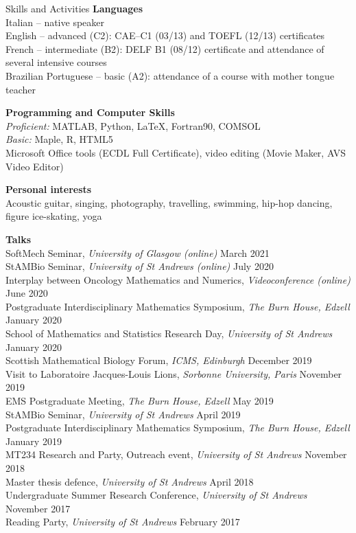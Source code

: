 \documentclass{resume} %
\begin{document}
\begin{rSection}{Skills and Activities}
{\bf Languages} \\
{Italian -- native speaker \\
English -- advanced (C2): CAE–C1 (03/13) and TOEFL (12/13) certificates \\
French – intermediate (B2): DELF B1 (08/12) certificate and attendance of several intensive courses %
\\ Brazilian Portuguese – basic (A2): attendance of a course with mother tongue teacher}

{\bf Programming and Computer Skills} \\
{{\em Proficient:} MATLAB, Python, LaTeX, Fortran90, COMSOL \\ {\em Basic:} Maple, R, HTML5 \\  Microsoft Office tools (ECDL Full Certificate), video editing (Movie Maker, AVS Video Editor)}

{\bf Personal interests}  \\
{Acoustic guitar, singing, photography, travelling, swimming, hip-hop dancing, figure ice-skating, yoga} 

{\bf Talks}  \\
SoftMech Seminar,  {\em University of Glasgow (online)} \hfill {March 2021} \\
StAMBio Seminar,  {\em University of St Andrews (online)} \hfill {July 2020} \\
Interplay between Oncology Mathematics and Numerics,  {\em Videoconference (online)} \hfill {June 2020} \\
Postgraduate Interdisciplinary Mathematics Symposium, {\em The Burn House, Edzell} \hfill {January 2020}\\
School of Mathematics and Statistics Research Day, {\em University of St Andrews} \hfill {January 2020}\\
Scottish Mathematical Biology Forum, {\em ICMS, Edinburgh}  \hfill {December 2019}\\
Visit to Laboratoire Jacques-Louis Lions,  {\em Sorbonne University, Paris} \hfill {November 2019} \\
EMS Postgraduate Meeting,  {\em The Burn House, Edzell} \hfill {May 2019} \\
StAMBio Seminar,  {\em University of St Andrews} \hfill {April 2019} \\
Postgraduate Interdisciplinary Mathematics Symposium,  {\em The Burn House, Edzell} \hfill {January 2019} \\
{MT234 Research and Party, Outreach event, {\em University of St Andrews} \hfill {November 2018} \\
Master thesis defence,  {\em University of St Andrews} \hfill {April 2018} \\
Undergraduate Summer Research Conference, {\em University of St Andrews} \hfill {November 2017} \\
Reading Party, {\em University of St Andrews} \hfill {February 2017} \\} 
\end{rSection}
\end{document}
